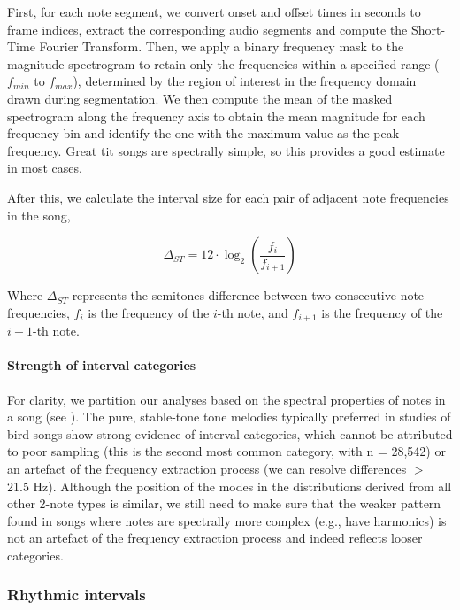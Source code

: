 First, for each note segment, we convert onset and offset times in seconds to frame indices, extract the corresponding audio segments and compute the Short-Time Fourier Transform. Then, we apply a binary frequency mask to the magnitude spectrogram to retain only the frequencies within a specified range ($f_{min}$ to $f_{max}$), determined by the region of interest in the frequency domain drawn during segmentation. We then compute the mean of the masked spectrogram along the frequency axis to obtain the mean magnitude for each frequency bin and identify the one with the maximum value as the peak frequency. Great tit songs are spectrally simple, so this provides a good estimate in most cases.

\noindent After this, we calculate the interval size for each pair of adjacent note frequencies in the song,

\begin{equation}
\Delta_{ST} = 12 \cdot \log_2\left(\frac{f_{i}}{f_{i+1}}\right)
\end{equation}

\noindent Where $\Delta_{ST}$ represents the semitones difference between two consecutive note frequencies, $f_{i}$ is the frequency of the $i$-th note, and $f_{i+1}$ is the frequency of the $i+1$-th note.


\paragraph{Strength of interval categories}
\label{c5:strength}
For clarity, we partition our analyses based on the spectral properties of notes in a song (see ). The pure, stable-tone tone melodies typically preferred in studies of bird songs \autocite{dobson1977, tierney2011a, doolittle2012, doolittle2014} show strong evidence of interval categories, which cannot be attributed to poor sampling (this is the second most common category, with n = 28,542) or an artefact of the frequency extraction process (we can resolve differences $>$ 21.5 Hz). Although the position of the modes in the distributions derived from all other 2-note types is similar, we still need to make sure that the weaker pattern found in songs where notes are spectrally more complex (e.g., have harmonics) is not an artefact of the frequency extraction process and indeed reflects looser categories.

\subsubsection{Rhythmic intervals}

